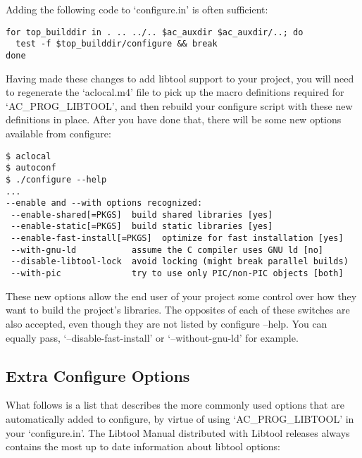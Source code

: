 Adding the following code to `configure.in' is often sufficient: 

\begin{verbatim}
for top_builddir in . .. ../.. $ac_auxdir $ac_auxdir/..; do
  test -f $top_builddir/configure && break
done
\end{verbatim}



Having made these changes to add libtool support to your project, you will need to regenerate the `aclocal.m4' file to pick up the macro definitions required for `AC\_{}PROG\_{}LIBTOOL', and then rebuild your configure script with these new definitions in place. After you have done that, there will be some new options available from configure: 

\begin{verbatim}
$ aclocal
$ autoconf
$ ./configure --help
...
--enable and --with options recognized:
 --enable-shared[=PKGS]  build shared libraries [yes]
 --enable-static[=PKGS]  build static libraries [yes]
 --enable-fast-install[=PKGS]  optimize for fast installation [yes]
 --with-gnu-ld           assume the C compiler uses GNU ld [no]
 --disable-libtool-lock  avoid locking (might break parallel builds)
 --with-pic              try to use only PIC/non-PIC objects [both]
\end{verbatim}

These new options allow the end user of your project some control over how they want to build the project's libraries. The opposites of each of these switches are also accepted, even though they are not listed by configure --help. You can equally pass, `--disable-fast-install' or `--without-gnu-ld' for example. 

\subsection{Extra Configure Options}
What follows is a list that describes the more commonly used options that are 
automatically added to configure, by virtue of using `AC\_{}PROG\_{}LIBTOOL'
in your `configure.in'. The Libtool Manual distributed with Libtool releases 
always contains the most up to date information about libtool options: 

